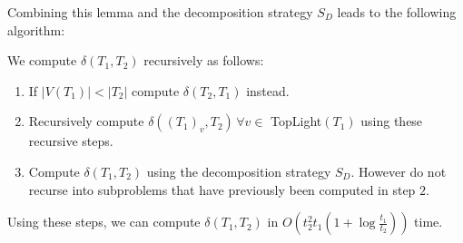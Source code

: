 Combining this lemma and the decomposition strategy $S_D$ leads to the following algorithm:
\begin{thm}
We compute $\delta(T_1, T_2)$ recursively as follows:
\begin{enumerate}
\item If $|V(T_1)| < |T_2|$ compute $\delta(T_2, T_1)$ instead.
\item Recursively compute $\delta((T_1)_v,T_2) \, \forall v \in$ TopLight$(T_1)$ using these recursive steps.
\item Compute $\delta(T_1, T_2)$ using the decomposition strategy $S_D$. However do not recurse into subproblems that have previously been computed in step $2$.
\end{enumerate}
Using these steps, we can compute $\delta(T_1,T_2)$ in $O(t_2^2t_1(1+\log \frac{t_1}{t_2}))$ time.
\end{thm}

